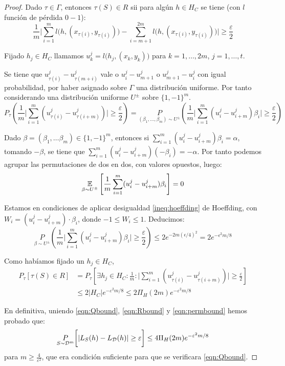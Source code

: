 \begin{proof}
  Dado $\tau \in \Gamma$, entonces $\tau(S) \in R$ sii para algún $h\in H_C$ se tiene (con $l$ función de pérdida $0-1$):
  \[
    \frac{1}{m} \bigg|\sum_{i=1}^m l\big(h,(x_{\tau(i)}, y_{\tau(i)}) \big) - 
    \sum_{i=m+1}^{2m} l\big(h,(x_{\tau(i)}, y_{\tau(i)})\big) \bigg| \ge \frac{\varepsilon}{2}
  \]
      
  Fijado $h_j \in H_C$ llamamos $u_k^j = l \big(h_j, (x_k,y_k) \big)$ para $k=1, \ldots, 2m$, $j=1, \ldots, t$.

  Se tiene que $u_{\tau(i)}^j - u_{\tau(m+i)}^j$ vale o $u_i^j - u_{m+1}^j$ o $u_{m+1}^j - u_i^j$ con igual probabilidad,
  por haber asignado sobre $\Gamma$ una distribución uniforme. Por tanto considerando una distribución uniforme $U^{\pm}$ 
  sobre $\{1,-1\}^m$.
  \[
    P_{\tau} \left(\frac{1}{m} \bigg|\sum_{i=1}^m (u_{\tau(i)}^j - u_{\tau(i+m)}^j) \bigg| \ge \frac{\varepsilon}{2} \right) = 
    \underset{(\beta_1, \ldots, \beta_m) \sim U^{\pm}}{P} \left(\frac{1}{m} \bigg|\sum_{i=1}^m (u_i^j - u_{i+m}^j)\beta_i \bigg| \ge 
    \frac{\varepsilon}{2} \right)
  \]
    
  Dado $\beta = (\beta_1, \ldots \beta_m) \in \{1,-1\}^m$, entonces si $\sum_{i=1}^m (u_i^j - u_{i+m}^j)\beta_i = \alpha$,
  tomando $-\beta$, se tiene que $\sum_{i=1}^m (u_i^j - u_{i+m}^j)(-\beta_i) = -\alpha$. Por tanto podemos 
  agrupar las permutaciones de dos en dos, con valores opuestos, luego:
  \[
    \underset{\beta \sim U^{\pm}}{\mathbb{E}} \left[\frac{1}{m}\sum_{i=1}^m (u_i^j - u_{i+m}^j)\beta_i \right] = 0
  \]

  Estamos en condiciones de aplicar desigualdad \ref{ineq:hoeffding} de Hoeffding, con $W_i = (u_i^j -u_{i+m}^j)\cdot \beta_i$,
  donde $-1 \le W_i \le 1$. Deducimos:
  \[
    \underset{\beta \sim U^{\pm}}{P} \left(\frac{1}{m} \bigg|\sum_{i=1}^m (u_{i}^j - u_{i+m}^j)\beta_i \bigg| \ge 
    \frac{\varepsilon}{2} \right) \le 2 e^{-2m (\epsilon/4)^2} = 2 e^{-\epsilon^2 m /8}
  \]

  Como habíamos fijado un $h_j\in H_C$, 
  \begin{align*}
  P_{\tau} [\tau(S) \in R] &= P_{\tau} \left[\exists h_j \in H_C: \frac{1}{m} : 
  \bigg|\sum_{i=1}^m (u_{\tau(i)}^j - u_{\tau(i+m)}^j) \bigg| \ge \frac{\varepsilon}{2} \right] \\
  &\le 2 |H_C| e^{-\varepsilon^2 m/8} \le 2\Pi_H(2m) e^{-\varepsilon^2 m/8}
  \end{align*}

  En definitiva, uniendo \eqref{eqn:Qbound}, \eqref{eqn:Rbound} y \eqref{eqn:permbound} hemos probado que:
  \[
    \underset{S\sim \mathcal{D}^m}{P} \bigg[|L_S(h) - L_{\mathcal{D}}(h)| \ge \varepsilon \bigg] \le 4 \Pi_H(2m) e^{- \varepsilon^2 m/8}
  \]
  para $m \ge \frac{4}{\varepsilon^2}$, que era condición suficiente para que se verificara \eqref{eqn:Qbound}.
  

\end{proof}
